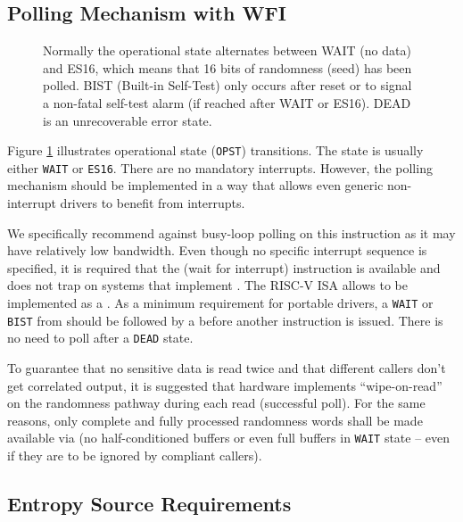 \subsection{Polling Mechanism with WFI}
\label{sec:es-polling}

\begin{figure}[tb]
    \centering
    
    \caption{Normally the operational state alternates between WAIT
        (no data) and ES16, which means that 16 bits of randomness (seed)
        has been polled. BIST (Built-in Self-Test) only occurs after reset
        or to signal a non-fatal self-test alarm (if reached after WAIT or
        ES16). DEAD is an unrecoverable error state.}
    \label{fig:esstate_tikz}
\end{figure}

    Figure \ref{fig:esstate_tikz} illustrates operational state
    (\verb|OPST|) transitions. The state is usually either \verb|WAIT| or
    \verb|ES16|. There are no mandatory interrupts. However, the polling
    mechanism should be implemented in a way that allows even generic
    non-interrupt drivers to benefit from interrupts.

    We specifically recommend against busy-loop polling on this instruction
    as it may have relatively low bandwidth. Even though no specific interrupt
    sequence is specified, it is required that the  (wait for
    interrupt) instruction is available and does not trap on systems that
    implement . The RISC-V ISA allows  to be
    implemented as a .
    As a minimum requirement for portable drivers, a \verb|WAIT| or
    \verb|BIST| from  should be followed by a
     before another  instruction is
    issued. There is no need to poll after a \verb|DEAD| state.

    To guarantee that no sensitive data is read twice and that different
    callers don't get correlated output, it is suggested that hardware
    implements ``wipe-on-read'' on the randomness pathway during each read
    (successful poll). For the same reasons, only complete and fully
    processed randomness words shall be made available via
     (no half-conditioned buffers or even full buffers
    in \verb|WAIT| state -- even if they are to be ignored by compliant
    callers).


\subsection{Entropy Source Requirements}
\label{sec:req-es}
\label{sec:req-entropy}
\label{sec:req-iid}
\label{sec:req-state}


